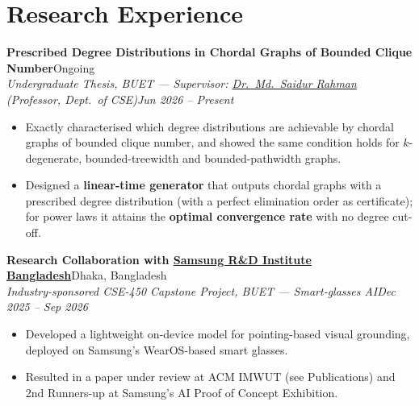 \documentclass[10pt,a4paper]{article}
\newcommand{\blink}[2]{\href{#1}{\textcolor{linkblue}{#2}}}
\newcommand{\entry}[4]{%
  \textbf{#1}\hfill #2\\
  \textit{#3}\hfill\textit{#4}\par\vspace{1pt}}
\begin{document}
\section{Research Experience}
\entry{Prescribed Degree Distributions in Chordal Graphs of Bounded Clique Number}{Ongoing}
      {Undergraduate Thesis, BUET --- Supervisor: \blink{https://saidurrahman.buet.ac.bd/}{Dr.\ Md.\ Saidur Rahman} (Professor, Dept.\ of CSE)}{Jun 2026 -- Present}
\begin{itemize}
  \item Exactly characterised which degree distributions are achievable by chordal graphs of bounded clique number, and showed the same condition holds for $k$-degenerate, bounded-treewidth and bounded-pathwidth graphs.
  \item Designed a \textbf{linear-time generator} that outputs chordal graphs with a prescribed degree distribution (with a perfect elimination order as certificate); for power laws it attains the \textbf{optimal convergence rate} with no degree cut-off.
\end{itemize}
\vspace{2pt}
\entry{Research Collaboration with \blink{https://research.samsung.com/srbd}{Samsung R\&D Institute Bangladesh}}{Dhaka, Bangladesh}
      {Industry-sponsored CSE-450 Capstone Project, BUET --- Smart-glasses AI}{Dec 2025 -- Sep 2026}
\begin{itemize}
  \item Developed a lightweight on-device model for pointing-based visual grounding, deployed on Samsung's WearOS-based smart glasses.
  \item Resulted in a paper under review at ACM IMWUT (see Publications) and 2nd Runners-up at Samsung's AI Proof of Concept Exhibition.
\end{itemize}
 
\end{document}
